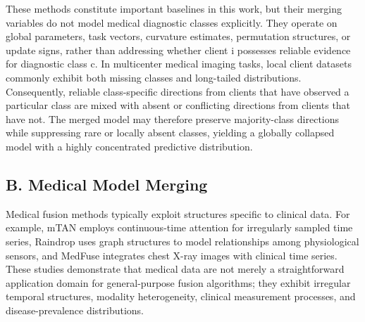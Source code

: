 \documentclass[letterpaper]{article} %
\begin{document}
These methods constitute important baselines in this work, but their merging variables do not model medical diagnostic classes explicitly. They operate on global parameters, task vectors, curvature estimates, permutation structures, or update signs, rather than addressing whether client i possesses reliable evidence for diagnostic class c. In multicenter medical imaging tasks, local client datasets commonly exhibit both missing classes and long-tailed distributions. Consequently, reliable class-specific directions from clients that have observed a particular class are mixed with absent or conflicting directions from clients that have not. The merged model may therefore preserve majority-class directions while suppressing rare or locally absent classes, yielding a globally collapsed model with a highly concentrated predictive distribution.


\subsection{B. Medical Model Merging}

Medical fusion methods typically exploit structures specific to clinical data. For example, mTAN employs continuous-time attention for irregularly sampled time series, Raindrop uses graph structures to model relationships among physiological sensors, and MedFuse integrates chest X-ray images with clinical time series. These studies demonstrate that medical data are not merely a straightforward application domain for general-purpose fusion algorithms; they exhibit irregular temporal structures, modality heterogeneity, clinical measurement processes, and disease-prevalence distributions.
\end{document}

